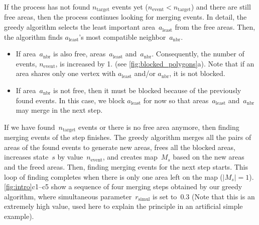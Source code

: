 \documentclass[twocolumn]{svjour3}          %
\begin{document}
If the process has not found $n_\mathrm{target}$ events yet
($n_\mathrm{event} < n_\mathrm{target}$)
and there are still free areas,
then the process continues looking for merging events.
In detail, the greedy algorithm selects the least important area~$a_\mathrm{least}$
from the free areas.
Then, the algorithm finds $a_\mathrm{least}$'s 
most compatible neighbor~$a_\mathrm{nbr}$.
\begin{itemize}[noitemsep,topsep=0pt]
\item If area~$a_\mathrm{nbr}$ is also free, 
 areas~$a_\mathrm{least}$ and~$a_\mathrm{nbr}$.
Consequently, the number of events, $n_\mathrm{event}$, is increased by 1.
(see \fig\ref{fig:blocked_polygons}a).
Note that if an area shares only one vertex 
with $a_\mathrm{least}$ and/or $a_\mathrm{nbr}$, it is not blocked.
\item If area~$a_\mathrm{nbr}$ is not free,
then it must be blocked because of the previously found events.
In this case, we block $a_\mathrm{least}$ for now
so that areas~$a_\mathrm{least}$ and~$a_\mathrm{nbr}$ 
may merge in the next step.
\end{itemize}


If we have found~$n_\mathrm{target}$ events 
or there is no free area anymore,
then finding merging events of the step finishes.
The greedy algorithm merges all the pairs of areas of the found events
to generate new areas,
frees all the blocked areas,
increases state~$s$ by value~$n_\mathrm{event}$,
and creates map~$M_s$ based on the new areas and the freed areas.
Then, finding merging events for the next step starts.
This loop of finding completes 
when there is only one area left on the map ($|M_s|=1$).
\figs\ref{fig:intro}c1--c5 show a sequence of four merging steps
obtained by our greedy algorithm,
where simultaneous parameter~$r_\mathrm{simul}$ is set to~$0.3$
(Note that this is an extremely high value, 
used here to explain the principle in an artificial simple example).



\end{document}
